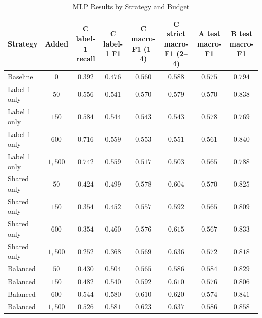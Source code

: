 \documentclass[letterpaper,conference,compsoc,onecolumn]{IEEEtran}
\begin{document}
\begin{table}[h]
  \centering
  \caption{MLP Results by Strategy and Budget}
  \label{table:mlp_strategy_budget}
  \begin{tabular}{lccccccc}
    \hline
    \textbf{Strategy} & \textbf{Added} & \textbf{C label-1 recall} & \textbf{C label-1 F1} & \textbf{C macro-F1 (1--4)} & \textbf{C strict macro-F1 (2--4)} & \textbf{A test macro-F1} & \textbf{B test macro-F1}\\
    \hline
    Baseline     & $0$     & $0.392$ & $0.476$ & $0.560$ & $0.588$ & $0.575$ & $0.794$\\
    Label 1 only & $50$    & $0.556$ & $0.541$ & $0.570$ & $0.579$ & $0.570$ & $0.838$\\
    Label 1 only & $150$   & $0.584$ & $0.544$ & $0.543$ & $0.543$ & $0.578$ & $0.769$\\
    Label 1 only & $600$   & $0.716$ & $0.559$ & $0.553$ & $0.551$ & $0.561$ & $0.840$\\
    Label 1 only & $1,500$ & $0.742$ & $0.559$ & $0.517$ & $0.503$ & $0.565$ & $0.788$\\
    Shared only  & $50$    & $0.424$ & $0.499$ & $0.578$ & $0.604$ & $0.570$ & $0.825$\\
    Shared only  & $150$   & $0.354$ & $0.452$ & $0.557$ & $0.592$ & $0.565$ & $0.809$\\
    Shared only  & $600$   & $0.354$ & $0.460$ & $0.576$ & $0.615$ & $0.567$ & $0.833$\\
    Shared only  & $1,500$ & $0.252$ & $0.368$ & $0.569$ & $0.636$ & $0.572$ & $0.818$\\
    Balanced     & $50$    & $0.430$ & $0.504$ & $0.565$ & $0.586$ & $0.584$ & $0.829$\\
    Balanced     & $150$   & $0.482$ & $0.540$ & $0.592$ & $0.610$ & $0.576$ & $0.806$\\
    Balanced     & $600$   & $0.544$ & $0.580$ & $0.610$ & $0.620$ & $0.574$ & $0.841$\\
    Balanced     & $1,500$ & $0.526$ & $0.581$ & $0.623$ & $0.637$ & $0.586$ & $0.858$\\
    \hline
  \end{tabular}
\end{table}
\end{document}
